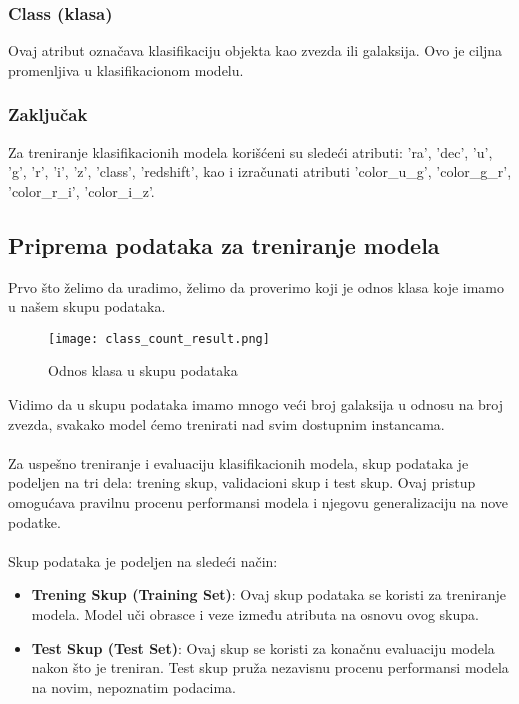 \documentclass[a4paper,12pt]{article}
\begin{document}
\subsubsection{Class (klasa)}
Ovaj atribut označava klasifikaciju objekta kao zvezda ili galaksija. Ovo je ciljna promenljiva u klasifikacionom modelu.

\subsubsection{Zaključak}
Za treniranje klasifikacionih modela korišćeni su sledeći atributi: 'ra', 'dec', 'u', 'g', 'r', 'i', 'z', 'class', 'redshift', kao i izračunati atributi 'color\_u\_g', 'color\_g\_r', 'color\_r\_i', 'color\_i\_z'.

\clearpage


\subsection{Priprema podataka za treniranje modela}

Prvo što želimo da uradimo, želimo da proverimo koji je odnos klasa koje imamo u našem skupu podataka.

\begin{figure}[h!]
\centering
\texttt{[image: class\_count\_result.png]}
\caption{Odnos klasa u skupu podataka}
\label{fig:sql_query}
\end{figure}

Vidimo da u skupu podataka imamo mnogo veći broj galaksija u odnosu na broj zvezda, svakako model ćemo trenirati nad svim dostupnim instancama.
\\\\Za uspešno treniranje i evaluaciju klasifikacionih modela, skup podataka je podeljen na tri dela: trening skup, validacioni skup i test skup. Ovaj pristup omogućava pravilnu procenu performansi modela i njegovu generalizaciju na nove podatke.
\\\\Skup podataka je podeljen na sledeći način:
\begin{itemize}
    \item \textbf{Trening Skup (Training Set)}: Ovaj skup podataka se koristi za treniranje modela. Model uči obrasce i veze između atributa na osnovu ovog skupa.
    \item \textbf{Test Skup (Test Set)}: Ovaj skup se koristi za konačnu evaluaciju modela nakon što je treniran. Test skup pruža nezavisnu procenu performansi modela na novim, nepoznatim podacima.
\end{itemize}
\end{document}
